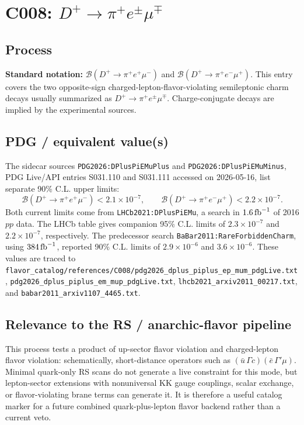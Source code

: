 
\section{C008: \texorpdfstring{\(D^+\to\pi^+e^\pm\mu^\mp\)}{D+ -> pi+ e mu}}

\subsection*{Process}
\textbf{Standard notation:}
\(\mathcal{B}(D^+\to\pi^+e^+\mu^-)\) and
\(\mathcal{B}(D^+\to\pi^+e^-\mu^+)\).  This entry covers the two
opposite-sign charged-lepton-flavor-violating semileptonic charm decays
usually summarized as \(D^+\to\pi^+e^\pm\mu^\mp\).  Charge-conjugate
decays are implied by the experimental sources.

\subsection*{PDG / equivalent value(s)}
The sidecar sources \texttt{PDG2026:DPlusPiEMuPlus} and
\texttt{PDG2026:DPlusPiEMuMinus}, PDG Live/API entries S031.110 and
S031.111 accessed on 2026-05-16, list separate 90\% C.L. upper limits:
\[
  \mathcal{B}(D^+\to\pi^+e^+\mu^-) < 2.1\times10^{-7},
  \qquad
  \mathcal{B}(D^+\to\pi^+e^-\mu^+) < 2.2\times10^{-7}.
\]
Both current limits come from \texttt{LHCb2021:DPlusPiEMu}, a search in
\(1.6\,{\rm fb}^{-1}\) of 2016 \(pp\) data.  The LHCb table gives companion
95\% C.L. limits of \(2.3\times10^{-7}\) and \(2.2\times10^{-7}\),
respectively.  The predecessor search \texttt{BaBar2011:RareForbiddenCharm},
using \(384\,{\rm fb}^{-1}\), reported 90\% C.L. limits of
\(2.9\times10^{-6}\) and \(3.6\times10^{-6}\).  These values are traced to
\texttt{flavor\_catalog/references/C008/pdg2026\_dplus\_piplus\_ep\_mum\_pdgLive.txt},
\texttt{pdg2026\_dplus\_piplus\_em\_mup\_pdgLive.txt},
\texttt{lhcb2021\_arxiv2011\_00217.txt}, and
\texttt{babar2011\_arxiv1107\_4465.txt}.

\subsection*{Relevance to the RS / anarchic-flavor pipeline}
This process tests a product of up-sector flavor violation and charged-lepton
flavor violation: schematically, short-distance operators such as
\((\bar u\,\Gamma c)(\bar e\,\Gamma'\mu)\).  Minimal quark-only RS scans do
not generate a live constraint for this mode, but lepton-sector extensions
with nonuniversal KK gauge couplings, scalar exchange, or flavor-violating
brane terms can generate it.  It is therefore a useful catalog marker for a
future combined quark-plus-lepton flavor backend rather than a current veto.

